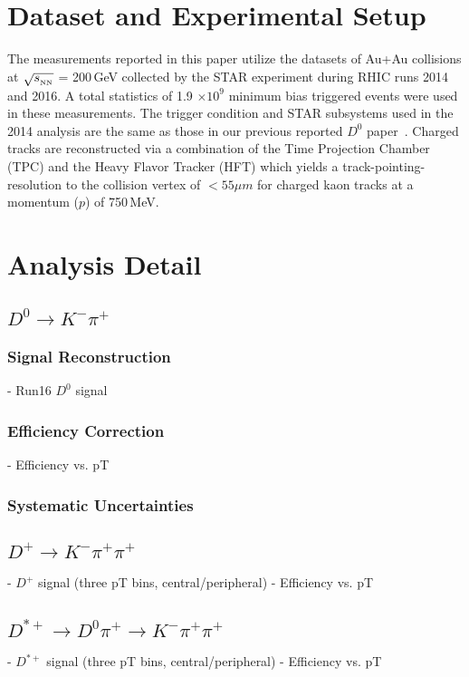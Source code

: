 \documentclass[%
 reprint,
 amsmath,amssymb,
 aps,
]{revtex4-1}
\begin{document}
\section{Dataset and Experimental Setup}
\label{sec:dataset}
The measurements reported in this paper utilize the datasets of Au+Au collisions at $\sqrt{s_{_{\rm NN}}}$ = 200\,GeV collected by the STAR experiment during RHIC runs 2014 and 2016. A total statistics of 1.9 $\times10^9$ minimum bias triggered events were used in these measurements. The trigger condition and STAR subsystems used in the 2014 analysis are the same as those in our previous reported $D^0$ paper~\cite{}. Charged tracks are reconstructed via a combination of the Time Projection Chamber (TPC) and the Heavy Flavor Tracker (HFT) which yields a track-pointing-resolution to the collision vertex of $<55\mu m$ for charged kaon tracks at a momentum ($p$) of 750\,MeV. 


\section{Analysis Detail}
\label{sec:ana}

\subsection{$D^0\rightarrow K^-\pi^+$}
\label{sec:ana:D0}

\subsubsection{Signal Reconstruction}
- Run16 $D^0$ signal

\subsubsection{Efficiency Correction}
- Efficiency vs. pT

\subsubsection{Systematic Uncertainties}

\subsection{$D^+\rightarrow K^-\pi^+\pi^+$}
\label{sec:ana:Dplus}
- $D^+$ signal (three pT bins, central/peripheral)
- Efficiency vs. pT

\subsection{$D^{*+}\rightarrow D^0\pi^+\rightarrow K^-\pi^+\pi^+$}
\label{sec:ana:Dstar}
- $D^{*+}$ signal (three pT bins, central/peripheral)
- Efficiency vs. pT
\end{document}
